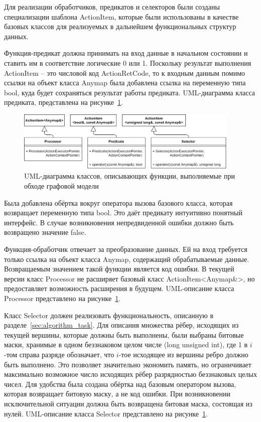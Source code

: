 Для реализации обработчиков, предикатов и селекторов были созданы специализации шаблона \textsf{ActionItem}, которые были использованы в качестве базовых классов для реализуемых в дальнейшем функциональных структур данных.

Функция-предикат должна принимать на вход данные в начальном состоянии и ставить им в соответствие логические 0 или 1. Поскольку результат выполнения \textsf{ActionItem} -- это числовой код \textsf{ActionRetCode}, то к входным данным помимо ссылки на объект класса Anymap была добавлена ссылка на переменную типа bool, куда будет сохраняться результат работы предиката. UML-диаграмма класса предиката, представлена на рисунке~\ref{fig:UMLGraphFunctions}.
\begin{figure}[!ht]
    \centering
    \includegraphics[width=0.95\textwidth]{figures/UML.graphFunctions.png}
    \caption{UML-диаграмма классов, описывающих функции, выполняемые при обходе графовой модели}
    \label{fig:UMLGraphFunctions}
\end{figure}

Была добавлена обёртка вокруг оператора вызова базового класса, которая возвращает переменную типа bool. Это даёт предикату интуитивно понятный интерфейс. В случае возникновения непредвиденной ошибки должно быть возвращено значение \textsf{false}.

Функция-обработчик отвечает за преобразование данных. Ей на вход требуется только ссылка на объект класса Anymap, содержащий обрабатываемые данные. Возвращаемым значением такой функции является код ошибки. В текущей версии класс \textsf{Processor} не расширяет базовый класс \textsf{ActionItem<Anymap\&>}, но предоставляет возможность расширения в будущем. UML-описание класса \textsf{Processor} представлено на рисунке~\ref{fig:UMLGraphFunctions}.

Класс \textsf{Selector} должен реализовать функциональность, описанную в разделе~\ref{sec:algorithm_task}. Для описания множества рёбер, исходящих из текущей вершины, которые должны быть выполнены, были выбраны битовые маски, хранимые в одном беззнаковом целом числе (\textsf{long unsigned int}), где 1 в $i$-том справа разряде обозначает, что $i$-тое исходящее из вершины ребро должно быть выполнено. Это позволяет значительно экономить память, но ограничивает максимально возможное число исходящих рёбер разрядностью беззнаковых целых чисел. Для удобства была создана обёртка над базовым оператором вызова, которая возвращает битовую маску, а не код ошибки. При возникновении исключительной ситуации должна быть возвращена битовая маска, состоящая из нулей. UML-описание класса \textsf{Selector} представлено на рисунке~\ref{fig:UMLGraphFunctions}.

